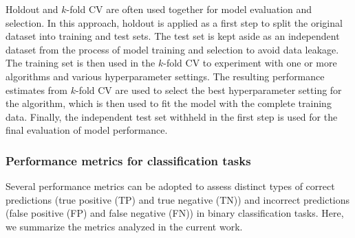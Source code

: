 Holdout and $k$-fold CV are often used together for model evaluation and selection. In this approach, holdout is applied as a first step to split the original dataset into training and test sets. The test set is kept aside as an independent dataset from the process of model training and selection to avoid data leakage. The training set is then used in the $k$-fold CV to experiment with one or more algorithms and various hyperparameter settings. The resulting performance estimates from $k$-fold CV are used to select the best hyperparameter setting for the algorithm, which is then used to fit the model with the complete training data. Finally, the independent test set withheld in the first step is used for the final evaluation of model performance.


\subsubsection{Performance metrics for classification tasks}


Several performance metrics can be adopted to assess distinct types of correct predictions (\ie true positive (TP) and true negative (TN)) and incorrect predictions (\ie false positive (FP) and false negative (FN)) in binary classification tasks. Here, we summarize the metrics analyzed in the current work.

